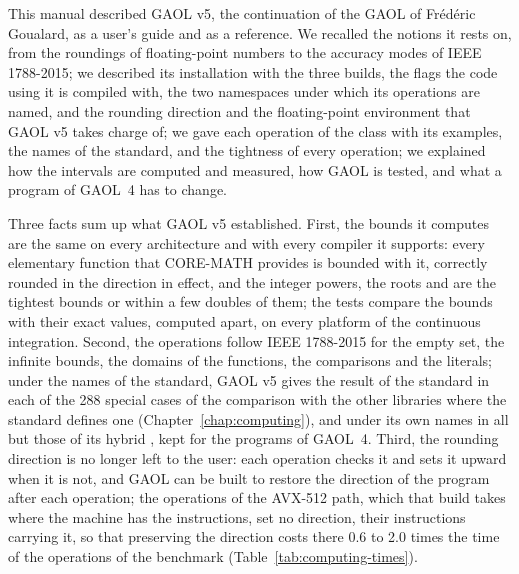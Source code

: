 \label{chap:conclusion}
\thispagestyle{plain}

This manual described GAOL v5, the continuation of the GAOL of Fr\'ed\'eric
Goualard, as a user's guide and as a reference. We recalled the notions it
rests on, from the roundings of floating-point numbers to the accuracy modes
of IEEE 1788-2015; we described its installation with the three builds, the
flags the code using it is compiled with, the two namespaces under which its
operations are named, and the rounding direction and the floating-point
environment that GAOL v5 takes charge of; we gave each operation of the class
 with its examples, the names of the standard, and the
tightness of every operation; we explained how the intervals are computed
and measured, how GAOL is tested, and what a program of GAOL~4 has to change.

\medskip
Three facts sum up what GAOL v5 established. First, the bounds it computes
are the same on every architecture and with every compiler it supports:
every elementary function that CORE-MATH provides is bounded with it, correctly
rounded in the direction in effect, and the integer powers, the roots and
 are the tightest bounds or within a few doubles of them; the
tests compare the bounds with their exact
values, computed apart, on every platform of the continuous integration.
Second, the operations follow IEEE 1788-2015 for the empty set, the infinite
bounds, the domains of the functions, the comparisons and the literals; under
the names of the standard, GAOL v5 gives the result of the standard in each of
the 288 special cases of the comparison with the other libraries where the standard
defines one (Chapter~\ref{chap:computing}), and under its
own names in all but those of its hybrid , kept for the programs of
GAOL~4. Third, the rounding direction is no longer left to the user: each
operation checks it and sets it upward when it is not, and GAOL can be built
to restore the direction of the program after each operation; the operations of
the AVX-512 path, which that build takes where the machine has the instructions,
set no direction, their instructions carrying it, so that preserving the
direction costs there 0.6 to 2.0 times the time of the operations of the
benchmark (Table~\ref{tab:computing-times}).

